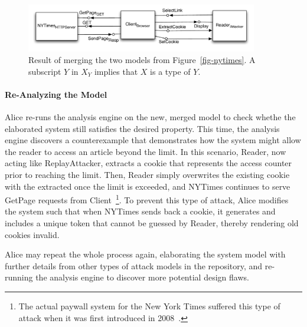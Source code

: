 \begin{figure}[!t]
\centering
\includegraphics[width=0.9\textwidth]{diagrams/merged}
\caption{Result of merging the two models from
  Figure~\ref{fig-nytimes}. A subscript $Y$ in $X_{Y}$ implies that
  $X$ is a type of $Y$.}
\label{fig-merged}
\end{figure}

\paragraph{\textbf{Re-Analyzing the Model}}

Alice re-runs the analysis engine on the new, merged model to check
whethe the elaborated system still satisfies the desired
property. This time, the analysis engine discovers a counterexample
that demonstrates how the system might allow the reader to access an
article beyond the limit. In this scenario, \textsf{Reader}, now
acting like \textsf{ReplayAttacker}, extracts a
cookie that represents the access counter prior to reaching the
limit. Then, \textsf{Reader} simply overwrites the existing cookie
with the extracted once the limit is exceeded, and \textsf{NYTimes}
continues to serve \textsf{GetPage} requests from
\textsf{Client}~\footnote{The actual paywall system for the New York
  Times suffered this type of attack when it was first introduced in
  2008~\cite{nytimes-attack}.}. To prevent this type of attack, Alice
modifies the system such that when \textsf{NYTimes} sends back a
cookie, it generates and includes a unique token that cannot be
guessed by \textsf{Reader}, thereby rendering old cookies invalid.



Alice may repeat the whole process again, elaborating the system model
with further details from other types of attack models in the
repository, and re-running the analysis engine to discover more
potential design flaws.

